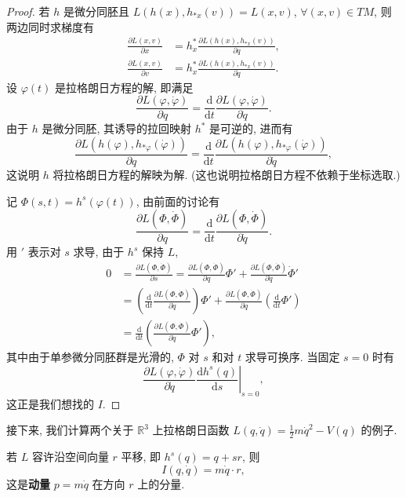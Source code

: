 \begin{proof}
    若 $ h $ 是微分同胚且 $ L(h(x),h_{*x}(v))=L(x,v) $, $ \forall(x,v)\in TM$, 则两边同时求梯度有
    \begin{align*}
        \frac{\partial L(x,v)}{\partial x} &= h^*_x\frac{\partial L(h(x),h_{*x}(v))}{\partial q},\\
        \frac{\partial L(x,v)}{\partial v} &= h^*_x\frac{\partial L(h(x),h_{*x}(v))}{\partial\dot{q}}.
    \end{align*}
    设 $ \varphi(t) $ 是拉格朗日方程的解, 即满足
    \[ \frac{\partial L(\varphi,\dot{\varphi})}{\partial q}=\frac{\mathrm{d}}{\mathrm{d}t}\frac{\partial L(\varphi,\dot{\varphi})}{\partial\dot{q}}. \]
    由于 $ h $ 是微分同胚, 其诱导的拉回映射 $ h^* $ 是可逆的, 进而有
    \[ \frac{\partial L(h(\varphi),h_{*\varphi}(\dot{\varphi}))}{\partial q}=\frac{\mathrm{d}}{\mathrm{d}t}\frac{\partial L(h(\varphi),h_{*\varphi}(\dot{\varphi}))}{\partial\dot{q}}, \]
    这说明 $ h $ 将拉格朗日方程的解映为解. (这也说明拉格朗日方程不依赖于坐标选取.)

    记 $ \Phi(s,t)=h^s(\varphi(t)) $, 由前面的讨论有
    \[ \frac{\partial L(\Phi,\dot{\Phi})}{\partial q}=\frac{\mathrm{d}}{\mathrm{d}t}\frac{\partial L(\Phi,\dot{\Phi})}{\partial\dot{q}}. \]
    用 $ ' $ 表示对 $ s $ 求导, 由于 $ h^s $ 保持 $ L $,
    \begin{align*}
        0 &= \frac{\partial L(\Phi,\dot{\Phi})}{\partial s}=\frac{\partial L(\Phi,\dot{\Phi})}{\partial q}\Phi'+\frac{\partial L(\Phi,\dot{\Phi})}{\partial\dot{q}}\dot{\Phi}'\\ 
        &= \left( \frac{\mathrm{d}}{\mathrm{d}t}\frac{\partial L(\Phi,\dot{\Phi})}{\partial\dot{q}} \right)\Phi'+\frac{\partial L(\Phi,\dot{\Phi})}{\partial\dot{q}}\left( \frac{\mathrm{d}}{\mathrm{d}t}\Phi' \right)\\ 
        &= \frac{\mathrm{d}}{\mathrm{d}t}\left( \frac{\partial L(\Phi,\dot{\Phi})}{\partial\dot{q}}\Phi' \right),
    \end{align*}
    其中由于单参微分同胚群是光滑的, $ \Phi $ 对 $ s $ 和对 $ t $ 求导可换序. 当固定 $ s=0 $ 时有
    \[ \frac{\partial L(\varphi,\dot{\varphi})}{\partial\dot{q}}\left.\frac{\mathrm{d}h^s(q)}{\mathrm{d}s}\right|_{s=0}, \]
    这正是我们想找的 $ I $. 
\end{proof}
接下来, 我们计算两个关于 $ \mathbb{R}^3 $ 上拉格朗日函数 $ L(q,\dot{q})=\frac{1}{2}m\dot{q}^2-V(q) $ 的例子.
\begin{example}[动量守恒]
    若 $ L $ 容许沿空间向量 $ r $ 平移, 即 $ h^s(q)=q+sr $, 则
    \[ I(q,\dot{q})=m\dot{q}\cdot r, \]
    这是{\bf 动量} $ p=m\dot{q} $ 在方向 $ r $ 上的分量.
\end{example}
